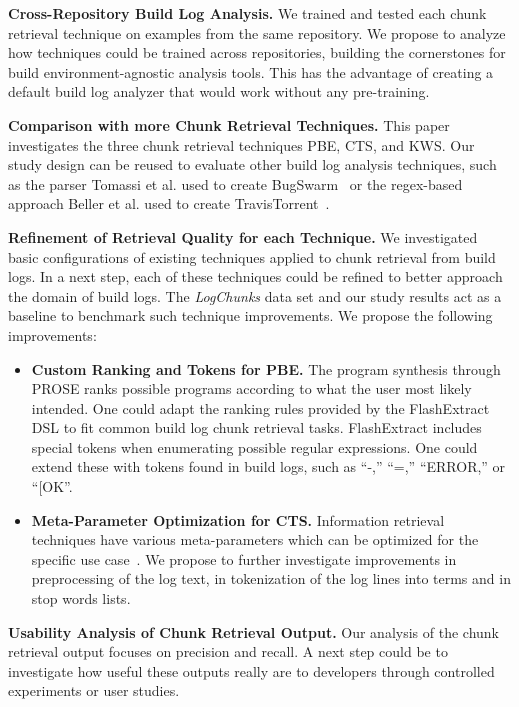 \textbf{Cross-Repository Build Log Analysis.}
We trained and
tested each chunk retrieval technique on examples from the same
repository.
We propose to analyze how techniques could be trained
across repositories, building the cornerstones for build
environment-agnostic analysis tools.
This has the advantage of creating
a default build log analyzer that would work without any pre-training.

\textbf{Comparison with more Chunk Retrieval Techniques.}
This
paper investigates the three chunk retrieval techniques PBE, CTS, and
KWS\@.
Our study design can be reused to evaluate other build log
analysis techniques, such as the parser Tomassi et al.
used to create
BugSwarm~\cite{tomassi2019bugswarm} or the regex-based approach
Beller et al.
used to create TravisTorrent~\cite{beller2017oops}.

\textbf{Refinement of Retrieval Quality for each Technique.} We
investigated basic configurations of existing techniques applied to
chunk retrieval from build logs.
In a next step, each of these
techniques could be refined to better approach the domain of build
logs.
The \emph{LogChunks} data set and our study results act as a
baseline to benchmark such technique improvements.
We propose the
following improvements:
\begin{itemize}[leftmargin=0.4cm]
  \item \textbf{Custom Ranking and Tokens for PBE.} The program
  synthesis through PROSE ranks possible programs according to
  what the user most likely intended.
  One could adapt the ranking
  rules provided by the FlashExtract DSL to fit common build log
  chunk retrieval tasks.
  FlashExtract includes special tokens when
  enumerating possible regular expressions.
  One could extend these
  with tokens found in build logs, such as ``-,''
	``=,'' ``ERROR,''
  or ``[OK''.
  \item \textbf{Meta-Parameter Optimization for CTS.} Information
  retrieval techniques have various meta-parameters which can be
  optimized for the specific use
  case~\cite{panichella2016parameterizing}.
  We propose to further
  investigate improvements in preprocessing of the log text, in
  tokenization of the log lines into terms and in stop words
  lists.
\end{itemize}

\textbf{Usability Analysis of Chunk Retrieval Output.}
Our
analysis of the chunk retrieval output focuses on
precision and recall.
A next step could be to investigate how useful these
outputs really are to developers through controlled experiments or
user studies.


